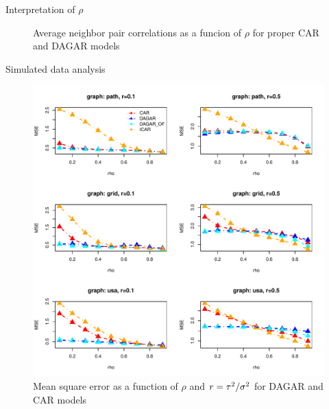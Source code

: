 \begin{frame}{Interpretation of $\rho$}
\begin{figure}
			\caption{Average neighbor pair correlations as a funcion of $\rho$ for proper CAR and DAGAR models}
	\end{figure}
\end{frame}

\begin{frame}{Simulated data analysis}
	\vskip -4mm\begin{figure}
		\includegraphics[scale=0.45]{../figures/mse.pdf}
		\vskip -6mm\caption{Mean square error as a function of $\rho$ and $r=\tau^2/\sigma^2$ for DAGAR and CAR models}
	\end{figure}
\end{frame}

